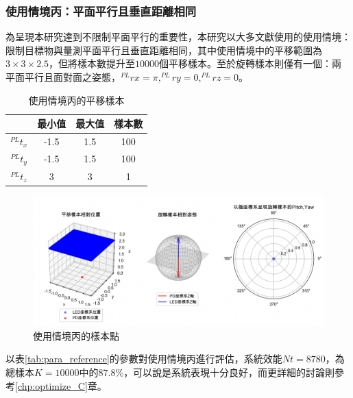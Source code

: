 \subsubsection{使用情境丙：平面平行且垂直距離相同}

為呈現本研究達到不限制平面平行的重要性，本研究以大多文獻使用的使用情境：限制目標物與量測平面平行且垂直距離相同，其中使用情境中的平移範圍為$3\times 3\times 2.5$，但將樣本數提升至$10000$個平移樣本。至於旋轉樣本則僅有一個：兩平面平行且面對面之姿態，$^{PL}rx=\pi,^{PL}ry=0,^{PL}rz=0$。

\begin{table}[htpb]
    \begin{center}
      \caption{使用情境丙的平移樣本}
      \label{tab:C_translate}
      \begin{tabular}{c|c|c|c} %
         & \textbf{最小值} & \textbf{最大值}&\textbf{樣本數}\\
        \hline
        $^{PL}t_x$ & -1.5 &1.5&100\\
        $^{PL}t_y$ & -1.5 & 1.5&100\\
        $^{PL}t_z$ & 3 & 3 &1\\
      \end{tabular}
    \end{center}
  \end{table}

\begin{figure}[htpb]
    \centering
    \includegraphics[width=15cm]{ch4pic/c_scenario.png}
    \caption{使用情境丙的樣本點}
    \label{pic:c_scenario}
\end{figure}

以表\ref{tab:para_reference}的參數對使用情境丙進行評估，系統效能$Nt=8780$，為總樣本$K=10000$中的$87.8\%$，可以說是系統表現十分良好，而更詳細的討論則參考\ref{chp:optimize_C}章。

